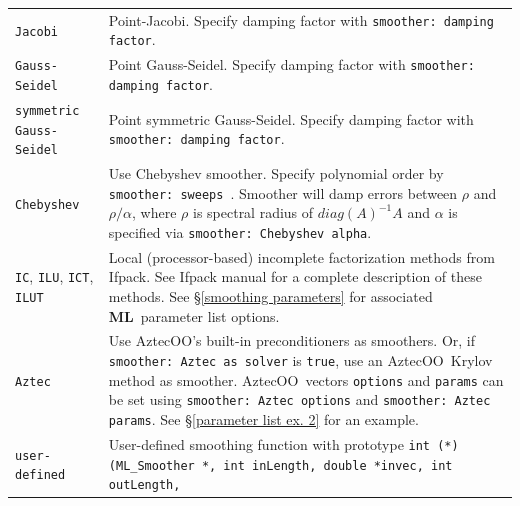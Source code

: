 \documentclass{article}[11pt]
\newcommand{\Aztecoo}  {{\sc AztecOO}}
\newcommand{\aztecoo}  {{\Aztecoo}}
\newcommand{\ML}     {{\bf ML}}
\newcommand{\ifpack}  {{\sc Ifpack}}
\begin{document}
\begin{table}[tbh]
\begin{center}
\begin{tabular}{ | p{4.5cm} | p{10cm} | }
\hline
\verb!Jacobi!                    & Point-Jacobi.
Specify damping factor with {\tt smoother: damping factor}.\\
%
\verb!Gauss-Seidel!              & Point Gauss-Seidel.
Specify damping factor with {\tt smoother: damping factor}.\\
%
\verb!symmetric Gauss-Seidel!    & Point symmetric Gauss-Seidel.
Specify damping factor with {\tt smoother: damping factor}.\\
%
\verb!Chebyshev!                 & Use Chebyshev smoother. Specify polynomial order
by {\tt \tt smoother: sweeps }. Smoother will damp errors between $\rho$ and
$\rho/\alpha$, where $\rho$ is spectral radius of $diag(A)^{-1} A$ and $\alpha$ is specified
  via {\tt smoother: Chebyshev alpha}.\\ 
%
%
%
\verb!IC!, \verb!ILU!,
\verb!ICT!, \verb!ILUT!          & Local (processor-based) incomplete
factorization methods from \ifpack.  See Ifpack manual
\cite{Ifpack-Ref-Guide} for a complete description of
these methods.  See \S\ref{smoothing parameters} for associated
\ML\ parameter list options.\\
%
\verb!Aztec!                     & Use \aztecoo's built-in preconditioners as
smoothers. Or, if {\tt smoother: Aztec as solver} is {\tt true},  use
an \aztecoo\ Krylov method as smoother.
\aztecoo~vectors \verb!options! and {\tt params} can be set using
{\tt smoother: Aztec options} and {\tt smoother: Aztec params}.
See \S\ref{parameter list ex. 2} for an example.\\
%
\verb!user-defined!              & User-defined smoothing function with
prototype {\tt int (*)(ML\_Smoother *, int inLength, double *invec, int outLength,
}
\end{tabular}
\end{center}
\end{table}
\end{document}
